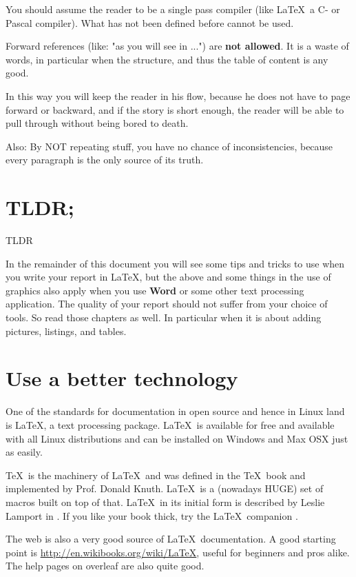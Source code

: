 You should assume the reader to be a single pass compiler (like
\LaTeX\ a C- or Pascal compiler). What has not been defined before
cannot be used.

Forward references (like: "as you will see in ...") are \textbf{not
  allowed}. It is a waste of words, in particular when the structure,
and thus the table of content is any good.

In this way you will keep the reader in his flow, because he does not
have to page forward or backward, and if the story is short enough,
the reader will be able to pull through without being bored to death.

Also: By NOT repeating stuff, you have no chance of inconsistencies,
because every paragraph is the only source of its truth.

\section{TLDR;}\gls{TLDR}

In the remainder of this document you will see some tips and tricks to
use when you write your report in \LaTeX, but the above and some
things in the use of graphics also apply when you use \textbf{Word} or
some other text processing application. The quality of your report
should not suffer from your choice of tools. So read those chapters as
well. In particular when it is about adding pictures, listings, and
tables.


\section{Use a better technology}
One of the standards for documentation in open source and hence in
Linux land is \LaTeX, a text processing package. \LaTeX\ is available
for free and available with all Linux distributions and can be
installed on Windows and Max OSX just as easily.

\TeX\ is the machinery of \LaTeX\ and was defined in the \TeX\ book
\cite{texbook} and implemented by
Prof. Donald Knuth. \LaTeX\ is a (nowadays HUGE) set of macros built
on top of that. \LaTeX\ in its initial form is described by Leslie
Lamport in \cite{latexbook}. If you like your book thick, try the
\LaTeX\ companion \cite{latexcompanion}.

The web is also a very good source of \LaTeX\ documentation. A good
starting point is \url{http://en.wikibooks.org/wiki/LaTeX}, useful for
beginners and pros alike. The help pages on overleaf are also quite good.

